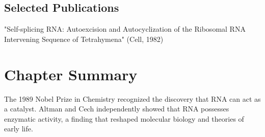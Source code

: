 \subsection*{Selected Publications}

"Self-splicing RNA: Autoexcision and Autocyclization of the Ribosomal RNA Intervening Sequence of Tetrahymena" (Cell, 1982)

\clearpage

\section*{Chapter Summary}

The 1989 Nobel Prize in Chemistry recognized the discovery that RNA can act as a catalyst. Altman and Cech independently showed that RNA possesses enzymatic activity, a finding that reshaped molecular biology and theories of early life.
